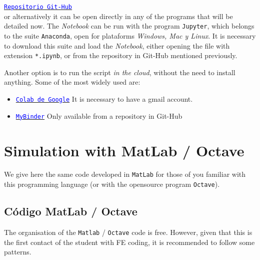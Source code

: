 \documentclass[spanish,a4paper,12pt]{article}
\begin{document}
\href{https://github.com/juanjosearribas/met_comp}{\textcolor{blue}{\texttt{Repositorio Git-Hub}}}\\

or alternatively it can be open directly in any of the programs that will be detailed now. The \emph{Notebook} can be run with the program \texttt{Jupyter}, which belongs to the suite \texttt{Anaconda}, open for plataforms \emph{Windows, Mac y Linux}. It is necessary to download this suite and load the \emph{Notebook}, either opening the file with extension \texttt{*.ipynb}, or from the repository in Git-Hub mentioned previously.

Another option is to run the script \emph{in the cloud}, without the need to install anything. Some of the most widely used are:

\begin{itemize}
\item  \href{https://colab.research.google.com}{\textcolor{blue}{\texttt{Colab de Google}}} It is necessary to have a gmail account.
\item  \href{http://mybinder.org/}{\textcolor{blue}{\texttt{MyBinder}}} Only available from a repository in Git-Hub
\end{itemize}




\clearpage
\appendix
{}
\section{Simulation with MatLab / Octave}
\label{sec:matlab}

We give here the same code developed in \texttt{MatLab} for those of you familiar with this programming language (or with the opensource program \texttt{Octave}).

\subsection*{Código MatLab / Octave}
\label{sec:esq}

The organisation of the \texttt{Matlab} / \texttt{Octave} code is free. However, given that this is the first contact of the student with FE coding, it is recommended to follow some patterns.
\end{document}
